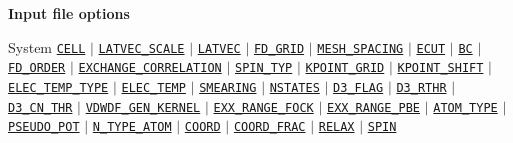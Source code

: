 \begin{frame}[allowframebreaks]{\textbf{Input file options}} \label{Index}
\vspace{-2mm}
\begin{block}{System}
\hyperlink{CELL}{\texttt{CELL}} $\vert$
\hyperlink{LATVEC_SCALE}{\texttt{LATVEC\_SCALE}} $\vert$
\hyperlink{LATVEC}{\texttt{LATVEC}}  $\vert$
\hyperlink{FD_GRID}{\texttt{FD\_GRID}} $\vert$
\hyperlink{MESH_SPACING}{\texttt{MESH\_SPACING}} $\vert$
\hyperlink{ECUT}{\texttt{ECUT}} $\vert$
\hyperlink{BC}{\texttt{BC}} $\vert$
\hyperlink{FD_ORDER}{\texttt{FD\_ORDER}} $\vert$
\hyperlink{EXCHANGE_CORRELATION}{\texttt{EXCHANGE\_CORRELATION}} $\vert$
\hyperlink{SPIN_TYP}{\texttt{SPIN\_TYP}} $\vert$
\hyperlink{KPOINT_GRID}{\texttt{KPOINT\_GRID}} $\vert$
\hyperlink{KPOINT_SHIFT}{\texttt{KPOINT\_SHIFT}} $\vert$
\hyperlink{ELEC_TEMP_TYPE}{\texttt{ELEC\_TEMP\_TYPE}} $\vert$
\hyperlink{ELEC_TEMP}{\texttt{ELEC\_TEMP}} $\vert$
\hyperlink{SMEARING}{\texttt{SMEARING}} $\vert$
\hyperlink{NSTATES}{\texttt{NSTATES}}     $\vert$
\hyperlink{D3_FLAG}{\texttt{D3\_FLAG}} $\vert$
\hyperlink{D3_RTHR}{\texttt{D3\_RTHR}} $\vert$
\hyperlink{D3_CN_THR}{\texttt{D3\_CN\_THR}} $\vert$
\hyperlink{VDWDF_GEN_KERNEL}{\texttt{VDWDF\_GEN\_KERNEL}} $\vert$
\hyperlink{EXX_RANGE_FOCK}{\texttt{EXX\_RANGE\_FOCK}} $\vert$ 
\hyperlink{EXX_RANGE_PBE}{\texttt{EXX\_RANGE\_PBE}} $\vert$ 
\hyperlink{ATOM_TYPE}{\texttt{ATOM\_TYPE}} $\vert$
\hyperlink{PSEUDO_POT}{\texttt{PSEUDO\_POT}}  $\vert$
\hyperlink{N_TYPE_ATOM}{\texttt{N\_TYPE\_ATOM}} $\vert$
\hyperlink{COORD}{\texttt{COORD}} $\vert$
\hyperlink{COORD_FRAC}{\texttt{COORD\_FRAC}} $\vert$
\hyperlink{RELAX}{\texttt{RELAX}} $\vert$
\hyperlink{SPIN}{\texttt{SPIN}} 
\end{block}


\end{frame}
